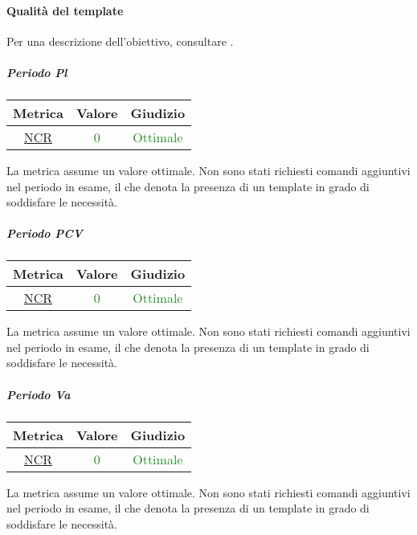 					
					\newpage
			\paragraph{Qualità del template}
				Per una descrizione dell'obiettivo, consultare .
				\subparagraph{Periodo Pl}
				\begin{table}[H]
					\centering
					\begin{tabular}{  c | c | c}
						\hline
						\textbf{Metrica} & \textbf{Valore} & \textbf{Giudizio} \\
						\hline
						\hyperref[MMC]{NCR}   & \textcolor{ForestGreen}{0}          & \textcolor{ForestGreen}{Ottimale} \\ \hline
					\end{tabular} 
				\end{table}
					La metrica assume un valore ottimale. Non sono stati richiesti comandi aggiuntivi nel periodo in esame, il che denota la presenza di un template in grado di soddisfare le necessità.
					
					
					\subparagraph{Periodo PCV}
					\begin{table}[H]
						\centering
						\begin{tabular}{  c | c | c}
							\hline
							\textbf{Metrica} & \textbf{Valore} & \textbf{Giudizio} \\
							\hline
							\hyperref[MMC]{NCR}   & \textcolor{ForestGreen}{0}          & \textcolor{ForestGreen}{Ottimale} \\ \hline
						\end{tabular} 
					\end{table}
					La metrica assume un valore ottimale. Non sono stati richiesti comandi aggiuntivi nel periodo in esame, il che denota la presenza di un template in grado di soddisfare le necessità.
					
					\subparagraph{Periodo Va}
					\begin{table}[H]
						\centering
						\begin{tabular}{  c | c | c}
							\hline
							\textbf{Metrica} & \textbf{Valore} & \textbf{Giudizio} \\
							\hline
							\hyperref[MMC]{NCR}   & \textcolor{ForestGreen}{0}          & \textcolor{ForestGreen}{Ottimale} \\ \hline
						\end{tabular} 
					\end{table}
					La metrica assume un valore ottimale. Non sono stati richiesti comandi aggiuntivi nel periodo in esame, il che denota la presenza di un template in grado di soddisfare le necessità.
					
